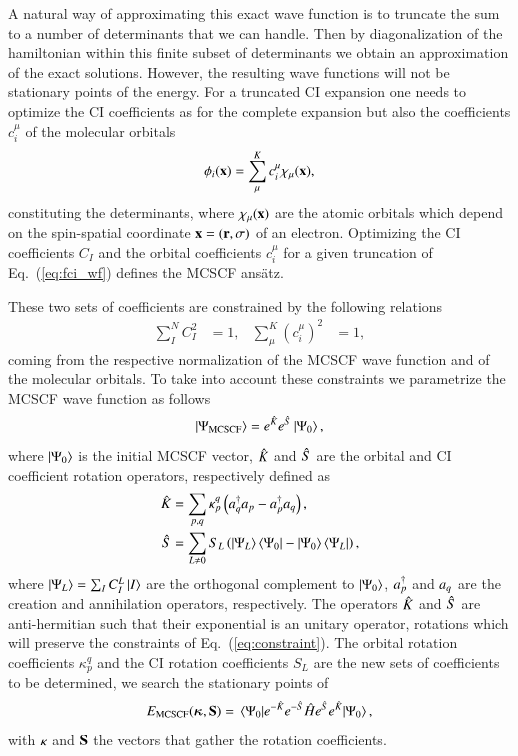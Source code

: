 \documentclass[aps,prb,reprint,showkeys,superscriptaddress]{revtex4-1}
\begin{document}
A natural way of approximating this exact wave function is to truncate the sum to a number of determinants that we can handle. Then by diagonalization of the hamiltonian within this finite subset of determinants we obtain an approximation of the exact solutions.
However, the resulting wave functions will not be stationary points of the energy.
For a truncated CI expansion one needs to optimize the CI coefficients as for the complete expansion but also the coefficients $c_i^\mu$ of the molecular orbitals
\begin{equation}
  \label{eq:mo}
  \phi_i(\vb{x}) = \sum^K_\mu c_i^\mu \chi_{\mu}(\vb{x}),
\end{equation}
constituting the determinants, where $\chi_{\mu}(\vb{x})$ are the atomic orbitals which depend on the spin-spatial coordinate $\vb{x} = (\vb{r},\sigma)$ of an electron.
Optimizing the CI coefficients $C_I$ and the orbital coefficients $c_i^\mu$ for a given truncation of Eq.~(\ref{eq:fci_wf}) defines the MCSCF ans\"atz.

These two sets of coefficients are constrained by the following relations
\begin{align}
  \label{eq:constraint}
  \sum_I^N C^2_I &= 1, & \sum^K_\mu (c_i^\mu)^2 &= 1,
\end{align}
coming from the respective normalization of the MCSCF wave function and of the molecular orbitals.
To take into account these constraints we parametrize the MCSCF wave function as follows
\begin{equation}
  \label{eq:mcscf_wf}
  \ket{\Psi_{\text{MCSCF}}}=e^{\Hat{K}}e^{\Hat{S}}\ket{\Psi_0},
\end{equation}
where $\ket{\Psi_0}$ is the initial MCSCF vector, $\Hat{K}$ and $\Hat{S}$ are the orbital and CI coefficient rotation operators, respectively defined as
\begin{align}
  \Hat{K} &= \sum_{p,q} \kappa_p^q \left( a_{q}^\dagger a_{p} - a_{p}^\dagger a_{q} \right),  \\
  \Hat{S} &= \sum_{L \neq 0} S_{L}\left(\ket{\Psi_L}\bra{\Psi_0}-\ket{\Psi_0}\bra{\Psi_L}\right),
\end{align}
where $\ket{\Psi_{L}} = \sum_I C_I^L\ket{I} $ are the orthogonal complement to $\ket{\Psi_0}$, $a_{p}^\dagger$ and $a_{q}$ are the creation and annihilation operators, respectively.
The operators $\Hat{K}$ and $\Hat{S}$ are anti-hermitian such that their exponential is an unitary operator, \ie rotations which will preserve the constraints of Eq.~(\ref{eq:constraint}).
The orbital rotation coefficients $\kappa_p^q$ and the CI rotation coefficients $S_{L}$ are the new sets of coefficients to be determined, \ie we search the stationary points of
\begin{equation}
  \label{eq:mcscf_nrj}
  E_{\text{MCSCF}}(\bm{\kappa},\vb{S}) = \mel{\Psi_0}{e^{-\Hat{K}}e^{-\Hat{S}} \Hat{H}e^{\Hat{S}}e^{\Hat{K}}}{\Psi_0},
\end{equation}
with $\vb{\kappa}$ and $\vb{S}$ the vectors that gather the rotation coefficients.
\end{document}
